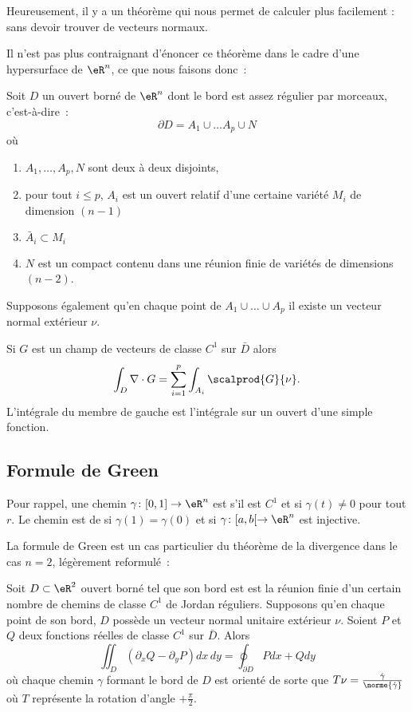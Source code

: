Heureusement, il y a un théorème qui nous permet de calculer plus facilement : sans devoir trouver de vecteurs normaux.

Il n'est pas plus contraignant d'énoncer ce théorème dans le cadre d'une hypersurface de $\eR^n$, ce que nous faisons donc~:
\begin{theorem}
	Soit $D$ un ouvert borné de $\eR^n$ dont le bord est \og assez régulier par morceaux\fg{}, c'est-à-dire~:
	\begin{equation}
		\partial D = A_1 \cup \ldots A_p \cup N
	\end{equation} 
	où
	\begin{enumerate}
		\item $A_1, \ldots, A_p, N$ sont deux à deux disjoints,
		\item pour tout $i \leq p$, $A_i$ est un ouvert relatif d'une certaine variété $M_i$ de dimension $(n-1)$
		\item $\bar A_i \subset M_i$
		\item $N$ est un compact contenu dans une réunion finie de variétés de dimensions $(n-2)$.
	\end{enumerate}
	Supposons également qu'en chaque point de $A_1 \cup \ldots \cup A_p$ il existe un vecteur normal extérieur $\nu$.
	
	Si $G$ est un champ de vecteurs de classe $C^1$ sur $\bar D$ alors
	\begin{equation}
		\int_D \nabla\cdot G = \sum_{i=1}^p \int_{A_i} \scalprod{G}{\nu}.
	\end{equation}
	L'intégrale du membre de gauche est l'intégrale sur un ouvert d'une simple fonction.
\end{theorem}

\subsection{Formule de Green}

Pour rappel, une chemin $\gamma\colon \mathopen[ 0 , 1 \mathclose]\to \eR^n$ est  s'il est $C^1$ et si $\gamma(t)\neq 0$ pour tout $r$. Le chemin est de  si $\gamma(1)=\gamma(0)$ et si $\gamma\colon \mathopen[ a , b [\to \eR^n$ est injective.

La formule de Green est un cas particulier du théorème de la divergence dans
le cas $n = 2$, légèrement reformulé~:
\begin{theorem}
	Soit $D \subset \eR^2$ ouvert borné tel que son bord est est la réunion finie d'un certain nombre de chemins de classe $C^1$ de Jordan réguliers.  Supposons qu'en chaque point de son bord, $D$ possède un vecteur normal unitaire extérieur $\nu$. Soient $P$ et $Q$ deux fonctions réelles de classe $C^1$ sur $\bar D$. Alors
    \begin{equation}  \label{EqYLblSqV}
    \iint_D (\partial_xQ - \partial_yP)dx\,dy = \oint_{\partial D}
    Pd x + Q d y
  \end{equation}
  où chaque chemin $\gamma$ formant le bord de $D$ est orienté de
  sorte que $T \nu = \frac{\dot\gamma}{\norme{\dot\gamma}}$ où $T$
  représente la rotation d'angle $+\frac\pi2$.
\end{theorem}

